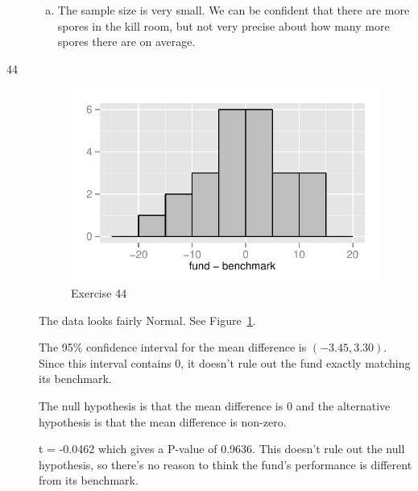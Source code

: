 \documentclass[letterpaper]{exam}
\begin{document}
\begin{description}
\begin{enumerate}[(a)]
          \item The sample size is very small. We can be confident that there
            are more spores in the kill room, but not very precise about how
            many more spores there are on average.

        \end{enumerate}

      \item[44]
        \begin{figure}[H]
          \centering
          \includegraphics[scale = 1.0]{figures/ex44.pdf}
          \caption{Exercise 44}\label{fig:ex44}
        \end{figure}

        The data looks fairly Normal. See Figure~\ref{fig:ex44}.

        The 95\% confidence interval for the mean difference is $(-3.45, 3.30)$.
        Since this interval contains 0, it doesn't rule out the fund exactly
        matching its benchmark.

        The null hypothesis is that the mean difference is 0 and the alternative
        hypothesis is that the mean difference is non-zero.

        t = -0.0462 which gives a P-value of 0.9636. This doesn't rule out the
        null hypothesis, so there's no reason to think the fund's performance is
        different from its benchmark.
        

\end{description}
\end{document}
